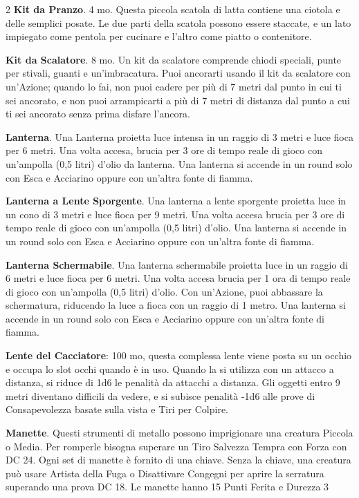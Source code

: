 \begin{multicols}{2}
\textbf{Kit da Pranzo}. 4 mo. Questa piccola scatola di latta contiene una ciotola e delle semplici posate. Le due parti della scatola possono essere staccate, e un lato impiegato come pentola per cucinare e l'altro come piatto o contenitore.

\textbf{Kit da Scalatore}. 8 mo. Un kit da scalatore comprende chiodi speciali, punte per stivali, guanti e un'imbracatura. Puoi ancorarti usando il kit da scalatore con un'Azione; quando lo fai, non puoi cadere per più di 7 metri dal punto in cui ti sei ancorato, e non puoi arrampicarti a più di 7 metri di distanza dal punto a cui ti sei ancorato senza prima disfare l'ancora.

\textbf{Lanterna}\label{Lanterna}\hypertarget{Lanterna}{}. Una Lanterna proietta luce intensa in un raggio di 3 metri e luce fioca per 6 metri. Una volta accesa, brucia per 3 ore di tempo reale di gioco con un'ampolla (0,5 litri) d'olio da lanterna. Una lanterna si accende in un round solo con Esca e Acciarino oppure con un'altra fonte di fiamma.

\textbf{Lanterna a Lente Sporgente}. Una lanterna a lente sporgente proietta luce in un cono di 3 metri e luce fioca per 9 metri. Una volta accesa brucia per 3 ore di tempo reale di gioco con un'ampolla (0,5 litri) d'olio. Una lanterna si accende in un round solo con Esca e Acciarino oppure con un'altra fonte di fiamma.

\textbf{Lanterna Schermabile}. Una lanterna schermabile proietta luce in un raggio di 6 metri e luce fioca per 6 metri. Una volta accesa brucia per 1 ora di tempo reale di gioco con un'ampolla (0,5 litri) d'olio. Con un'Azione, puoi abbassare la schermatura, riducendo la luce a fioca con un raggio di 1 metro. Una lanterna si accende in un round solo con Esca e Acciarino oppure con un'altra fonte di fiamma.

\textbf{Lente del Cacciatore}: 100 mo, questa complessa lente viene posta su un occhio e occupa lo slot occhi quando è in uso. Quando la si utilizza con un attacco a distanza, si riduce di 1d6 le penalità da attacchi a distanza. Gli oggetti entro 9 metri diventano difficili da vedere, e si subisce penalità -1d6 alle prove di Consapevolezza basate sulla vista e Tiri per Colpire.

\textbf{Manette}\label{Manette}\hypertarget{Manette}{}. Questi strumenti di metallo possono imprigionare una creatura Piccola o Media. Per romperle bisogna superare un Tiro Salvezza Tempra con Forza con DC 24. Ogni set di manette è fornito di una chiave. Senza la chiave, una creatura può usare Artista della Fuga o Disattivare Congegni per aprire la serratura superando una prova DC 18. Le manette hanno 15 Punti Ferita e Durezza 3


\end{multicols}
